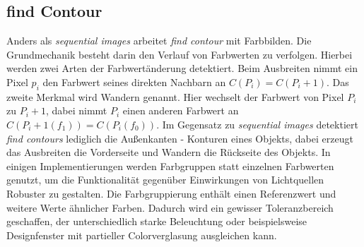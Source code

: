 	
		\subsection{find Contour}
		Anders als \textit{sequential images} arbeitet \textit{find contour} mit Farbbilden. Die Grundmechanik besteht darin den Verlauf von Farbwerten zu verfolgen. Hierbei werden zwei Arten der Farbwertänderung detektiert. Beim Ausbreiten nimmt ein Pixel $p_i$  den Farbwert seines direkten Nachbarn an $C(P_i) = C(P_i+1)$. Das zweite Merkmal wird Wandern genannt. Hier wechselt der Farbwert von Pixel $P_i$ zu $P_i+1$, dabei nimmt $P_i$ einen anderen Farbwert an $C(P_i+1(f_1)) = C(P_i(f_0))$. Im Gegensatz zu \textit{sequential images} detektiert \textit{find contours} lediglich die Außenkanten - Konturen eines Objekts, dabei erzeugt das Ausbreiten die Vorderseite und Wandern die Rückseite des Objekts. In einigen Implementierungen werden Farbgruppen statt einzelnen Farbwerten genutzt, um die Funktionalität gegenüber Einwirkungen von Lichtquellen Robuster zu gestalten. Die Farbgruppierung enthält einen Referenzwert und weitere Werte ähnlicher Farben. Dadurch wird ein gewisser Toleranzbereich geschaffen, der unterschiedlich starke Beleuchtung oder beispielsweise Designfenster mit partieller Colorverglasung ausgleichen kann.
		

